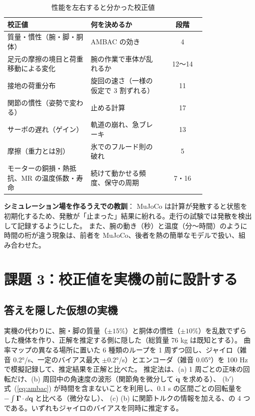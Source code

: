 \documentclass[paper=a4paper,fontsize=10pt,twocolumn,column_gap=2zw,line_length=24zw,number_of_lines=46,head_space=20mm]{jlreq}
\begin{document}
\begin{table}[t]\centering\small
\caption{性能を左右すると分かった校正値}\label{tab:calibvals}
\setlength{\tabcolsep}{3pt}
\begin{tabular}{p{0.42\linewidth}p{0.38\linewidth}c}\toprule
校正値 & 何を決めるか & 段階 \\\midrule
質量・慣性（腕・脚・胴体） & AMBAC の効き & 4 \\
足元の摩擦の境目と荷重移動による変化 & 腕の作業で車体が乱れるか & 12〜14 \\
接地の荷重分布 & 旋回の速さ（一様の仮定で 3 割ずれる） & 11 \\
関節の慣性（姿勢で変わる） & 止める計算 & 17 \\
サーボの遅れ（ゲイン） & 軌道の崩れ、急ブレーキ & 13 \\
摩擦（重力とは別） & 氷でのフルード則の破れ & 5 \\
モーターの銅損・熱抵抗、MR の温度係数・寿命 & 続けて動かせる頻度、保守の周期 & 7・16 \\\bottomrule
\end{tabular}
\end{table}

\textbf{シミュレーション場を作るうえでの教訓}：
MuJoCo は計算が発散すると状態を初期化するため、発散が「止まった」結果に紛れる。走行の試験では発散を検出して記録するようにした。
また、腕の動き（秒）と温度（分〜時間）のように時間の桁が違う現象は、前者を MuJoCo、後者を熱の簡単なモデルで扱い、組み合わせた。


\section{課題 3：校正値を実機の前に設計する}

\subsection{答えを隠した仮想の実機}
実機の代わりに、腕・脚の質量（$\pm15\%$）と胴体の慣性（$\pm10\%$）を乱数でずらした機体を作り、正解を推定する側に隠した（総質量 76 kg は既知とする）。
曲率マップの異なる場所に置いた 6 種類のループを 1 周ずつ回し、ジャイロ（雑音 0.2°/s、一定のバイアス最大 $\pm0.2$°/s）とエンコーダ（雑音 0.05°）を 100 Hz で模擬記録して、推定結果を正解と比べた。
推定法は、(a) 1 周ごとの正味の回転だけ、(b) 周回中の角速度の波形（関節角を微分して $\dot{\bm q}$ を求める）、
(b$'$) 式~(\ref{eq:ambac}) が時間を含まないことを利用し、0.1 s の区間ごとの回転量を $-\int\bm\Gamma\cdot d\bm q$ と比べる（微分なし）、
(c) (b) に関節トルクの情報を加える、の 4 つである。いずれもジャイロのバイアスを同時に推定する。
\end{document}
